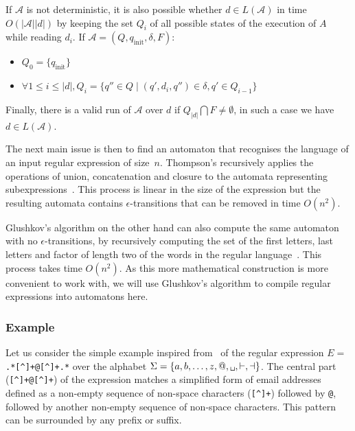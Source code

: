 \documentclass[11px]{article}
\theoremstyle{definition}
\begin{document}
        If $\mathcal{A}$ is not deterministic, it is also possible whether $d
        \in L(\mathcal{A})$ in time $O(|\mathcal{A}| |d|)$ by keeping the set
        $Q_i$ of all possible states of the execution of $A$ while reading
        $d_i$. If $\mathcal{A} = (Q, q_\text{init}, \delta, F)$:
        \begin{itemize}
          \item $Q_0 = \{q_\text{init}\}$
          \item $\forall 1 \leq i \leq |d|, Q_i = \{q'' \in Q \mid (q', d_i,
            q'') \in \delta,
            q' \in Q_{i-1}\}$
        \end{itemize}
        Finally, there is a valid run of $\mathcal{A}$ over $d$ if $Q_{|d|}
        \bigcap F \neq \emptyset$, in such a case we have $d \in
        L(\mathcal{A})$.

        \vspace{0.5cm}

        The next main issue is then to find an automaton that recognises the
        language of an input regular expression of size~$n$. Thompson's
        recursively applies the operations of union, concatenation and closure
        to the automata representing
        subexpressions~\cite{thompson1968programming}. This process is linear
        in the size of the expression but the resulting automata contains
        $\epsilon$-transitions that can be removed in time $O(n^2)$.

        Glushkov's algorithm on the other hand can also compute the same
        automaton with no $\epsilon$-transitions, by recursively computing the
        set of the first letters, last letters and factor of length two of the
        words in the regular language~\cite{glushkov1961abstract}. This process
        takes time $O(n^2)$. As this more mathematical construction is more
        convenient to work with, we will use Glushkov's algorithm to compile
        regular expressions into automatons here.

      \subsubsection{Example}%
        \label{sec:example_simple}

        Let us consider the simple example inspired from~\cite{ICDT19} of the
        regular expression $E =$
        \texttt{.*[\textasciicircum\textvisiblespace]+@[\textasciicircum\textvisiblespace]+.*}
        over the alphabet $\Sigma = \{a, b, \ldots, z, @, \texttt
        \textvisiblespace, \vdash, \dashv\}$.  The central part
        (\texttt{[\textasciicircum\textvisiblespace]+@[\textasciicircum\textvisiblespace]+})
        of the expression matches a simplified form of email addresses defined
        as a non-empty sequence of non-space characters
        (\texttt{[\textasciicircum\textvisiblespace]+}) followed by \texttt{@},
        followed by another non-empty sequence of non-space characters. This
        pattern can be surrounded by any prefix or suffix.
\end{document}
